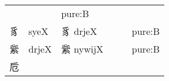 \documentclass[14pt,a4paper]{scrartcl}
\begin{document}
\begin{longtable}[c]{@{}llllll@{}}
\begin{minipage}[t]{0.14\columnwidth}
\strut\end{minipage} &
\begin{minipage}[t]{0.14\columnwidth}\raggedright\strut
\strut\end{minipage} &
\begin{minipage}[t]{0.14\columnwidth}\raggedright\strut
pure:B
\strut\end{minipage}\tabularnewline
\begin{minipage}[t]{0.14\columnwidth}\raggedright\strut
豸
\strut\end{minipage} &
\begin{minipage}[t]{0.14\columnwidth}\raggedright\strut
syeX
\strut\end{minipage} &
\begin{minipage}[t]{0.14\columnwidth}\raggedright\strut
豸 drjeX
\strut\end{minipage} &
\begin{minipage}[t]{0.14\columnwidth}\raggedright\strut
\strut\end{minipage} &
\begin{minipage}[t]{0.14\columnwidth}\raggedright\strut
\strut\end{minipage} &
\begin{minipage}[t]{0.14\columnwidth}\raggedright\strut
pure:B
\strut\end{minipage}\tabularnewline
\begin{minipage}[t]{0.14\columnwidth}\raggedright\strut
繠
\strut\end{minipage} &
\begin{minipage}[t]{0.14\columnwidth}\raggedright\strut
drjeX
\strut\end{minipage} &
\begin{minipage}[t]{0.14\columnwidth}\raggedright\strut
繠 nywijX
\strut\end{minipage} &
\begin{minipage}[t]{0.14\columnwidth}\raggedright\strut
\strut\end{minipage} &
\begin{minipage}[t]{0.14\columnwidth}\raggedright\strut
\strut\end{minipage} &
\begin{minipage}[t]{0.14\columnwidth}\raggedright\strut
pure:B
\strut\end{minipage}\tabularnewline
\begin{minipage}[t]{0.14\columnwidth}\raggedright\strut
卮
\strut\end{minipage} &
\begin{minipage}[t]{0.14\columnwidth}\raggedright\strut

\end{minipage}
\end{longtable}
\end{document}
